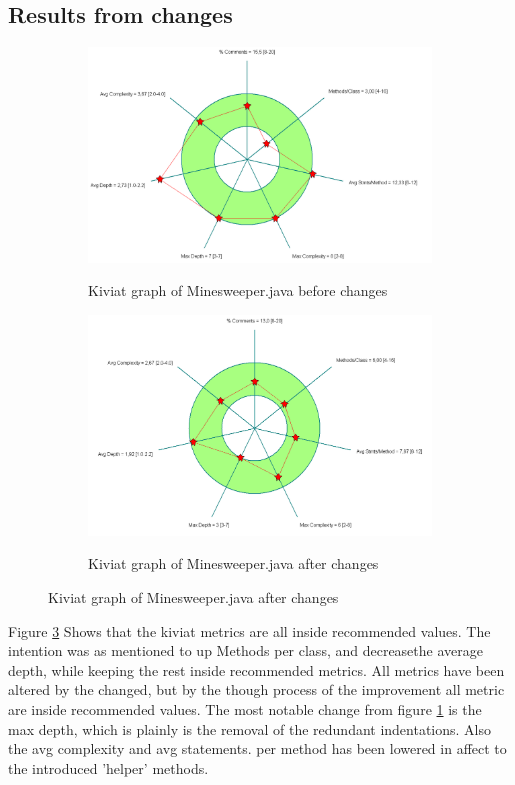 \documentclass[UKenglish]{article}  %
\begin{document}
\subsection{Results from changes}
\begin{figure}[h]
	\begin{subfigure}[b]{0.5\textwidth}
		\caption{Kiviat graph of Minesweeper.java before changes}
		\includegraphics[width=\textwidth]{kiviat_minesweeper_before}
		\label{minesweeper_before}
	\end{subfigure}
	\begin{subfigure}[b]{0.5\textwidth}
		\caption{Kiviat graph of Minesweeper.java after changes}
		\includegraphics[width=\textwidth]{kiviat_minesweeper_after}
		\label{minesweeper_after}
	\end{subfigure}
\end{figure}

Figure \ref{minesweeper_after} Shows that the kiviat metrics are all inside 
recommended values. The intention was as mentioned to up Methods per class, and
decreasethe average depth, while keeping the rest inside recommended metrics. 
All metrics have been altered by the changed, but by the though process of the
improvement all metric are inside recommended values. The most notable change
from figure \ref{minesweeper_before} is the max depth, which is plainly is the
removal of the redundant indentations. Also the avg complexity and avg 
statements.
per method has been lowered in affect to the introduced 'helper' methods. 
\end{document}
